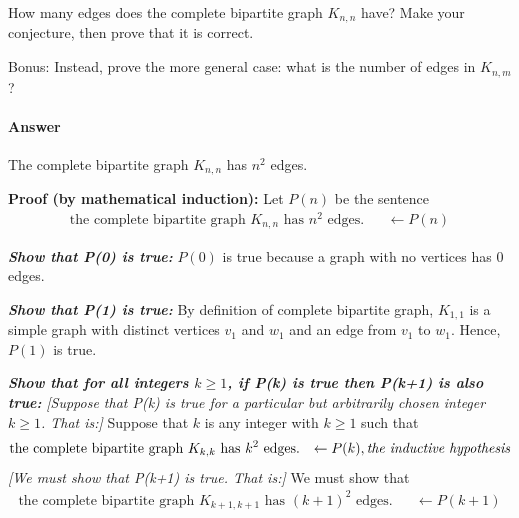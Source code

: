 \documentclass{article}
\begin{document}
How many edges does the complete bipartite graph $K_{n,n}$ have?  Make your
conjecture, then prove that it is correct.

Bonus: Instead, prove the more general case:
what is the number of edges in $K_{n,m}$?

\paragraph{Answer}

The complete bipartite graph $K_{n,n}$ has $n^2$ edges.

\textbf{Proof (by mathematical induction):} Let $P(n)$ be the sentence
\begin{align}
    \nonumber \text{the complete bipartite graph $K_{n,n}$ has $n^2$ edges.} && \leftarrow P(n)
\end{align}

\emph{\textbf{Show that P(0) is true:}} \newline
$P(0)$ is true because a graph with no vertices has 0 edges.

\emph{\textbf{Show that P(1) is true:}} \newline
By definition of complete bipartite graph, $K_{1,1}$ is a simple graph with distinct vertices $v_1$ and $w_1$ and an edge from $v_1$ to $w_1$. Hence, $P(1)$ is true.

\emph{\textbf{Show that for all integers $k \geq 1$, if P(k) is true then P(k+1) is also true:}}
\newline \emph{[Suppose that P(k) is true for a particular but arbitrarily chosen integer $k \geq 1$. That is:]} \newline
Suppose that $k$ is any integer with $k \geq 1$ such that
\begin{align}
    \nonumber \text{the complete bipartite graph $K_{k,k}$ has $k^2$ edges.} && \leftarrow P(k), \text{\emph{the inductive hypothesis}}
\end{align}
\emph{[We must show that P(k+1) is true. That is:]} We must show that
\begin{align}
    \nonumber \text{the complete bipartite graph $K_{k+1,k+1}$ has $(k+1)^2$ edges.} && \leftarrow P(k+1)
\end{align}
\end{document}
